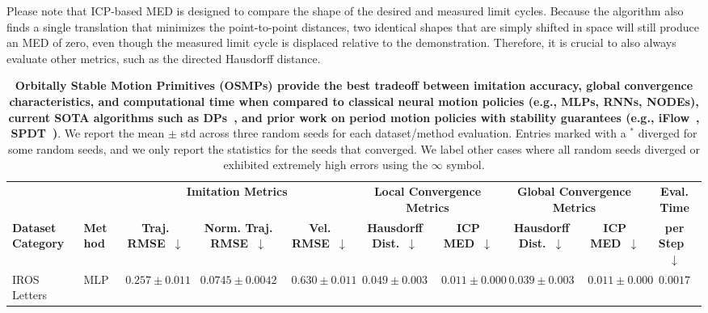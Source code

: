 Please note that \gls{ICP}-based \gls{MED} is designed to compare the shape of the desired and measured limit cycles. Because the algorithm also finds a single translation that minimizes the point-to-point distances, two identical shapes that are simply shifted in space will still produce an MED of zero, even though the measured limit cycle is displaced relative to the demonstration.
Therefore, it is crucial to also always evaluate other metrics, such as the directed Hausdorff distance.

\begin{table}[htbp]\centering
    \centering
    \caption{\textbf{Orbitally Stable Motion Primitives (\glspl{OSMP}) provide the best tradeoff between imitation accuracy, global convergence characteristics, and computational time when compared to classical neural motion policies (e.g., \glspl{MLP}, \glspl{RNN}, \glspl{NODE}), current SOTA algorithms such as \glspl{DP}~\citep{chi2023diffusion}, and prior work on period motion policies with stability guarantees (e.g., iFlow~\citep{urain2020imitationflow}, \gls{SPDT}~\citep{zhi2024teaching})}. We report the mean $\pm$ std across three random seeds for each dataset/method evaluation. Entries marked with a $^*$ diverged for some random seeds, and we only report the statistics for the seeds that converged. We label other cases where all random seeds diverged or exhibited extremely high errors using the \emph{$\infty$} symbol.}
    \label{tab:osmp:benchmarking_quantitative_results} %
    \setlength{\tabcolsep}{2.0pt}   %
    \renewcommand{\arraystretch}{1.2} %
    \begin{tiny}
    \begin{tabular}{|l|l|ccc|cc|cc|c|}   %
    \toprule
    & & \multicolumn{3}{c|}{\textbf{Imitation Metrics}} & \multicolumn{2}{c|}{\textbf{Local Convergence Metrics}} & \multicolumn{2}{c|}{\textbf{Global Convergence Metrics}} & \textbf{Eval. Time}\\
    \textbf{Dataset Category} & \textbf{Method} & \textbf{Traj. RMSE~$\downarrow$} & \textbf{Norm. Traj. \gls{RMSE}~$\downarrow$} & \textbf{Vel. RMSE~$\downarrow$} & \textbf{Hausdorff Dist.~$\downarrow$} & \textbf{\gls{ICP} \gls{MED}~$\downarrow$} & \textbf{Hausdorff Dist.~$\downarrow$} & \textbf{\gls{ICP} \gls{MED}~$\downarrow$} & \textbf{per Step~$\downarrow$}\\
    \midrule
    \multirow{8}{*}{IROS Letters} & MLP & $0.257 \pm 0.011$ & $0.0745 \pm 0.0042$ & $0.630 \pm 0.011$ & $0.049 \pm 0.003$ & $0.011 \pm 0.000$ & $0.039 \pm 0.003$ & $0.011 \pm 0.000$ & $0.0017$\\

\end{tabular}
\end{tiny}
\end{table}
